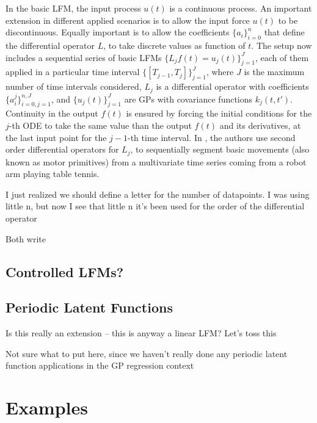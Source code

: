 \documentclass[journal]{IEEEtran}
\newcommand{\mauricio}[1]{{\color{blue}#1}}
\newcommand{\simo}[1]{{\color{red}#1}}
\begin{document}
In the basic LFM, the input process $u(t)$ is a continuous process. An important extension in different applied scenarios
is to allow the input force $u(t)$ to be discontinuous. Equally important is to allow the coefficients $\{a_i\}_{i=0}^n$ that
define the differential operator $L$, to take discrete values as function of $t$. The setup now includes a sequential
series of basic LFMs $\{L_jf(t) = u_j(t)\}_{j=1}^J$, each of them applied in a particular time interval
$\{[T_{j-1}, T_j]\}_{j=1}^J$, where $J$ is the maximum number of time intervals considered, $L_j$ is a differential operator
with coefficients $\{a_i^j\}_{i=0,j=1}^{n, J}$, and $\{u_j(t)\}_{j=1}^J$ are GPs with covariance functions $k_j(t,t')$.
Continuity in the output $f(t)$ is ensured by forcing the initial conditions for the $j$-th ODE to take the same value
than the output $f(t)$ and its derivatives, at the last input point for the $j-1$-th time interval.
In \cite{Alvarez:switched11}, the authors use second order differential operators for $L_j$, to sequentially segment
basic movements (also known as motor primitives) from a multivariate time series coming from a robot arm playing table
tennis.

\mauricio{I just realized we should define a letter for the number of datapoints. I was using little n, but now I see
that little n it's been used for the order of the differential operator}

\simo{Both write}


\subsection{\simo{Controlled LFMs?}}


\subsection{Periodic Latent Functions}

\simo{Is this really an extension -- this is anyway a linear LFM? Let's toss this}



\mauricio{Not sure what to put here, since we haven't really done any periodic latent function applications in the GP
regression context}

\section{Examples}
\end{document}
